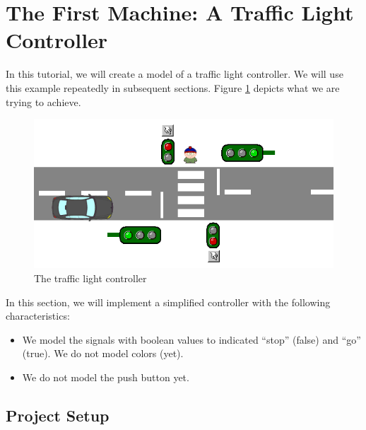 \section{The First Machine: A Traffic Light Controller}
\label{tutorial_03}



In this tutorial, we will create a model of a traffic light controller.  We will use this example repeatedly in subsequent sections.  Figure \ref{fig_tut_03_traffic_light} depicts what we are trying to achieve.

\begin{figure}[!h]
\begin{center}
	\includegraphics[]{img/tutorial/tut_03_trafficlight.png}
	\caption{The traffic light controller}
	\label{fig_tut_03_traffic_light}
\end{center}
\end{figure}

In this section, we will implement a simplified controller with the following characteristics:
\begin{itemize}
	\item We model the signals with boolean values to indicated ``stop'' (false) and ``go'' (true).  We do not model colors (yet).
	\item We do not model the push button yet.
\end{itemize}

\subsection{Project Setup}
\label{tutorial_03_project_setup}

